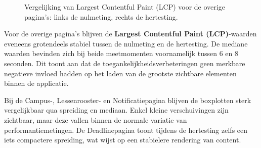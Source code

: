 \begin{figure}[H]
\caption{Vergelijking van Largest Contentful Paint (LCP) voor de overige pagina’s: links de nulmeting, rechts de hertesting.}
\label{fig:lcp-hertesting}
\end{figure}

Voor de overige pagina’s blijven de \textbf{Largest Contentful Paint (LCP)}-waarden eveneens grotendeels stabiel tussen de nulmeting en de hertesting. De mediane waarden bevinden zich bij beide meetmomenten voornamelijk tussen 6 en 8 seconden. Dit toont aan dat de toegankelijkheidsverbeteringen geen merkbare negatieve invloed hadden op het laden van de grootste zichtbare elementen binnen de applicatie.

Bij de Campus-, Lessenrooster- en Notificatiepagina blijven de boxplotten sterk vergelijkbaar qua spreiding en mediaan. Enkel kleine verschuivingen zijn zichtbaar, maar deze vallen binnen de normale variatie van performantiemetingen. De Deadlinepagina toont tijdens de hertesting zelfs een iets compactere spreiding, wat wijst op een stabielere rendering van content.

